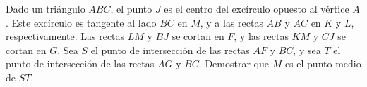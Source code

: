 Dado un triángulo $ABC$, el punto $J$ es el centro del excírculo opuesto al vértice $A$. Este excírculo es tangente al lado $BC$ en $M$, y a las rectas $AB$ y $AC$ en $K$ y $L$, respectivamente. Las rectas $LM$ y $BJ$ se cortan en $F$, y las rectas $KM$ y $CJ$ se cortan en $G$. Sea $S$ el punto de intersección de las rectas $AF$ y $BC$, y sea $T$ el punto de intersección de las rectas $AG$ y $BC$.  \newline 
Demostrar que $M$ es el punto medio de $ST$.
